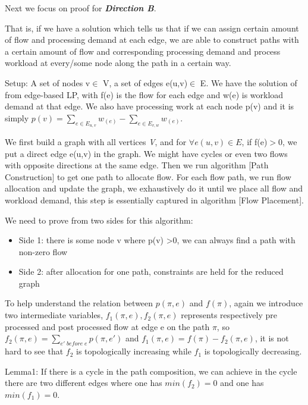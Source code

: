 \documentclass{sig-alternate}
\begin{document}
Next we focus on proof for \textbf{\textit{Direction B}}.

That is, if we have a solution which tells us that if we can assign certain amount of flow and processing 
demand at each edge, we are able to construct paths with a certain amount of flow 
and corresponding processing demand and process workload at every/some node along the path in a certain way.


Setup:
A set of nodes  v$\in$ V, a set of edges e(u,v)$\in$ E. We have the solution of from edge-based LP, with 
f(e) is the flow for each edge and w(e) is workload demand at that edge. We also have processing work at each node p(v) and it is simply $p(v) = 
\sum\limits_{e \in E_{u, v} }w_(e) - \sum\limits_{e \in E_{v, w} }w_(e)  $.

We first build a graph with all vertices \textit{V}, and for $\forall e(u,v) \in E $, if f(e)$ >$0, we put a direct edge e(u,v) in the graph. We might have cycles or even two flows with opposite directions at the same edge. Then we run algorithm [Path Construction] to get one path to allocate flow. For each flow path, we run flow allocation and update the graph, we exhaustively do it until we place all flow and workload demand, this step is essentially captured in algorithm [Flow Placement]. 

We need to prove from two sides for this algorithm: 
\begin{itemize}
  \item {Side 1: there is some node v where p(v) >0, we can always find a path with non-zero flow}
   \item {Side 2: after allocation for one path, constraints are held for the reduced graph} 
\newline
\end{itemize}

To help understand the relation between $p(\pi, e)$ and $f(\pi)$, again we introduce two intermediate variables, $f_1(\pi, e), f_2(\pi, e) $ represents respectively pre processed and post processed flow at edge e on the path $\pi$, so $f_2(\pi, e) =\sum\limits_{e'\; before\;e}p(\pi, e') $ and $ f_1(\pi, e)=f(\pi)- f_2(\pi, e)$, it is not hard to see that $f_2$ is topologically increasing while $f_1$ is topologically decreasing.

Lemma1: If there is a cycle in the path composition, we can achieve in the cycle there are two different edges where one has $min(f_2) = 0$ and one has $min(f_1)=0$. 
\end{document}
